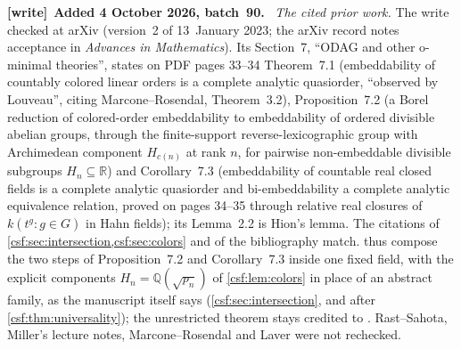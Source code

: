 \documentclass[11pt,a4paper]{article}
\numberwithin{equation}{section}
\theoremstyle{definition}
\theoremstyle{remark}
\newcommand{\Q}{\mathbb Q}
\newcommand{\R}{\mathbb R}
\newenvironment{writenote}[1][]{\par\smallskip\begingroup\small\raggedright
 \setlength{\parindent}{1.25em}\noindent\textbf{[write]}\if\relax\detokenize{#1}\relax\else~\textbf{#1.}\fi\ }%
 {\par\endgroup\smallskip}
\begin{document}
\begin{writenote}[Added 4 October 2026, batch~90]
\emph{The cited prior work.} The write checked \cite{cmms} at arXiv (version~2 of 13~January 2023; the arXiv record notes acceptance in \emph{Advances in Mathematics}). Its Section~7, ``ODAG and other o-minimal theories'', states on PDF pages 33--34 Theorem~7.1 (embeddability of countably colored linear orders is a complete analytic quasiorder, ``observed by Louveau'', citing Marcone--Rosendal, Theorem~3.2), Proposition~7.2 (a Borel reduction of colored-order embeddability to embeddability of ordered divisible abelian groups, through the finite-support reverse-lexicographic group with Archimedean component $H_{c(n)}$ at rank $n$, for pairwise non-embeddable divisible subgroups $H_n\subseteq\R$) and Corollary~7.3 (embeddability of countable real closed fields is a complete analytic quasiorder and bi-embeddability a complete analytic equivalence relation, proved on pages 34--35 through relative real closures of $k(t^g:g\in G)$ in Hahn fields); its Lemma~2.2 is Hion's lemma. The citations of \cref{csf:sec:intersection,csf:sec:colors} and of the bibliography match.  thus compose the two steps of Proposition~7.2 and Corollary~7.3 inside one fixed field, with the explicit components $H_n=\Q(\sqrt{p_n})$ of \cref{csf:lem:colors} in place of an abstract family, as the manuscript itself says (\cref{csf:sec:intersection}, and after \cref{csf:thm:universality}); the unrestricted theorem stays credited to \cite{cmms}. Rast--Sahota, Miller's lecture notes, Marcone--Rosendal and Laver were not rechecked.


\end{writenote}
\end{document}
